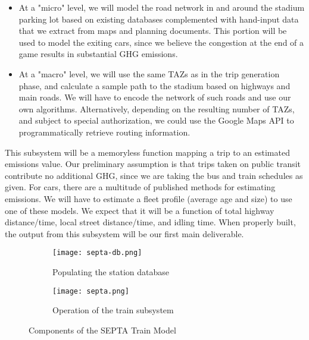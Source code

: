 \documentclass[12pt]{article}
\begin{document}
\begin{description}[style=nextline]
\begin{description}[style=nextline]
\begin{itemize}
          \item At a "micro" level, we will model the road network in
        and around the stadium parking lot based on existing databases
        complemented with hand-input data that we extract from maps
        and planning documents. This portion will be used to model the
        exiting cars, since we believe the congestion at the end of a
        game results in substantial GHG emissions.
          \item At a "macro" level, we will use the same TAZs as in
        the trip generation phase, and calculate a sample path to the
        stadium based on highways and main roads.  We will have to
        encode the network of such roads and use our own algorithms.
        Alternatively, depending on the resulting number of TAZs, and
        subject to special authorization, we could use the Google Maps
        API to programmatically retrieve routing information.
      \end{itemize}
    \end{description}
      \item[GHG Calculator] This subsystem will be a memoryless
    function mapping a trip to an estimated emissions value. Our
    preliminary assumption is that trips taken on public transit
    contribute no additional GHG, since we are taking the bus and
    train schedules as given. For cars, there are a multitude of
    published methods for estimating emissions. We will have to
    estimate a fleet profile (average age and size) to use one of
    these models. We expect that it will be a function of total
    highway distance/time, local street distance/time, and idling
    time. When properly built, the output from this subsystem will be
    our first main deliverable.
\end{description}

\begin{figure}[htp]
  \centering
  \begin{subfigure}{.504\textwidth}
    \centering
    \texttt{[image: septa-db.png]}
    \caption{Populating the station database}
    \label{septa-db}
  \end{subfigure}
    \begin{subfigure}{.394\textwidth}
    \centering
    \texttt{[image: septa.png]}
    \caption{Operation of the train subsystem}
    \label{septa}
  \end{subfigure}
  \caption{Components of the SEPTA Train Model}
\end{figure}
\end{document}
